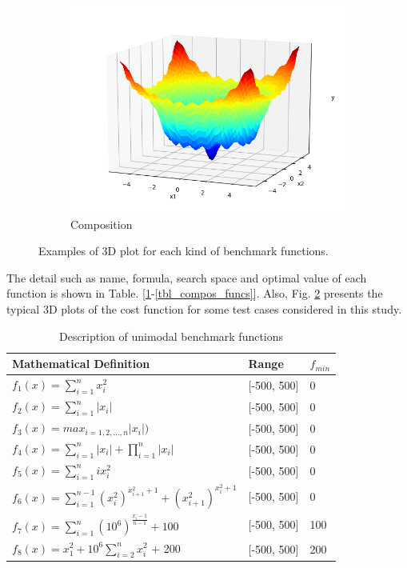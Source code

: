 \documentclass[a4paper,13pt,2p]{report}
\begin{document}
\begin{figure}[!ht]
\begin{subfigure}{0.24\textwidth}
  	 \includegraphics[width=1\linewidth]{png/functions/islo_compos_F30}
  	 \caption{Composition}
  	\label{subfig:compos}
  	\end{subfigure}
  \caption{Examples of 3D plot for each kind of benchmark functions.} 
  \label{fig_functions} 
\end{figure}

The detail such as name, formula, search space and optimal value of each function is shown in Table. [\ref{tbl_uni_funcs}-\ref{tbl_compos_funcs}]. Also, Fig. \ref{fig_functions} presents the typical 3D plots of the cost function for some test cases considered in this study. 

\begin{table}[!t]
\caption{Description of unimodal benchmark functions}
\label{tbl_uni_funcs}
\centering
\begin{tabular}{p{9cm} p{2cm} p{1cm}}
 \hline Mathematical Definition & Range & $f_{min}$  \\ 
 \hline
$f_1(x) = \sum_{i=1}^n x_i^2$ & [-500, 500] & 0 \\
$f_2(x) =  \sum_{i=1}^n |x_i|$ & [-500, 500] & 0 \\
$f_3(x) =  max_{i = 1, 2,...,n}|x_i|)$ & [-500, 500] & 0 \\
$f_4(x) =  \sum_{i=1}^n |x_i| + \prod_{i=1}^n |x_i|$  & [-500, 500] & 0 \\
$f_5(x) =  \sum_{i=1}^n ix_i^2$ & [-500, 500] & 0 \\
$f_6(x) =  \sum_{i=1}^{n-1} (x_i^2)^{x_{i+1}^2+1} + (x_{i+1}^2)^{x_{i}^2+1}$ & [-500, 500] & 0 \\
$f_7(x) =  \sum_{i=1}^n (10^6)^{\frac{x_i-1}{n-1}} + 100$ & [-500, 500] & 100 \\
$f_8(x) = x_1^2 + 10^6\sum_{i=2}^n x_i^2$ + 200 & [-500, 500] & 200 \\
 \hline
\end{tabular}
\end{table}
\end{document}
